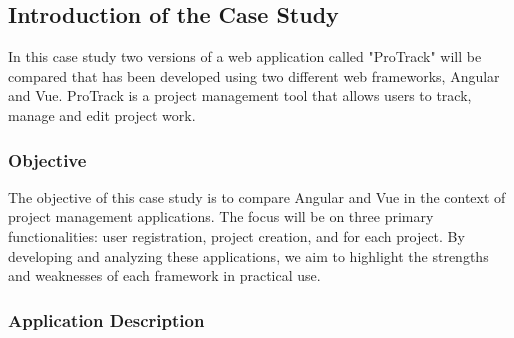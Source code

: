 \documentclass[conference]{IEEEtran}
\begin{document}





\subsection{Introduction of the Case Study}
In this case study two versions of a web application called "ProTrack" will be compared that has been developed using two different web frameworks, Angular and Vue. ProTrack is a project management tool that allows users to track, manage and edit project work.\newline
\subsubsection{Objective}
The objective of this case study is to compare Angular and Vue in the context of project management applications. The focus will be on three primary functionalities: user registration, project creation, and  for each project. By developing and analyzing these applications, we aim to highlight the strengths and weaknesses of each framework in practical use.
\newline
\subsubsection{Application Description}
\end{document}
